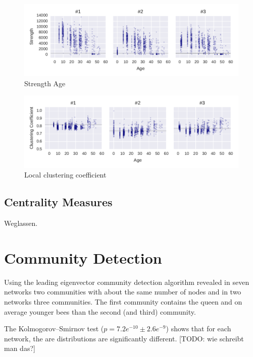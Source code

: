 \begin{figure}[htb]
	\centering
	\includegraphics[width=1.0\textwidth]{Figures/stat-strengthAge}
	\caption[Strength Age]{Strength Age}
	\label{fig:strengthAge}
\end{figure}	


\begin{figure}[htb]
	\centering
	\includegraphics[width=1.0\textwidth]{Figures/stat-ccAge}
	\caption[Local clustering coefficient]{Local clustering coefficient}
	\label{fig:ccAge}
\end{figure}	


\subsection{Centrality Measures}
Weglassen.



\section{Community Detection}

Using the leading eigenvector community detection algorithm revealed in seven networks two communities with about the same number of nodes and in two networks three communities. The first community contains the queen and on average younger bees than the second (and third) community.

The Kolmogorov–Smirnov  test ($p=7.2e^{-10} \pm2.6e^{-9}$) shows that for each network, the are distributions are significantly different. [TODO: wie schreibt man das?]


